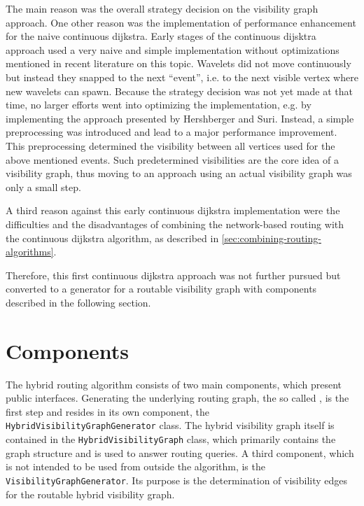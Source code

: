 		The main reason was the overall strategy decision on the visibility graph approach.
		One other reason was the implementation of performance enhancement for the naive continuous dijkstra.
		Early stages of the continuous dijsktra approach used a very naive and simple implementation without optimizations mentioned in recent literature on this topic.
		Wavelets did not move continuously but instead they snapped to the next \enquote{event}, i.e. to the next visible vertex where new wavelets can spawn.
		Because the strategy decision was not yet made at that time, no larger efforts went into optimizing the implementation, e.g. by implementing the approach presented by Hershberger and Suri\cite{hershberger-suri}.
		Instead, a simple preprocessing was introduced and lead to a major performance improvement.
		This preprocessing determined the visibility between all vertices used for the above mentioned events.
		Such predetermined visibilities are the core idea of a visibility graph, thus moving to an approach using an actual visibility graph was only a small step.
		
		A third reason against this early continuous dijkstra implementation were the difficulties and the disadvantages of combining the network-based routing with the continuous dijkstra algorithm, as described in \cref{sec:combining-routing-algorithms}.
		
		Therefore, this first continuous dijkstra approach was not further pursued but converted to a generator for a routable visibility graph with components described in the following section.
	
\section{Components}
\label{sec:components}

	The hybrid routing algorithm consists of two main components, which present public interfaces.
	Generating the underlying routing graph, the so called , is the first step and resides in its own component, the \texttt{HybridVisibilityGraphGenerator} class.
	The hybrid visibility graph itself is contained in the \texttt{HybridVisibilityGraph} class, which primarily contains the graph structure and is used to answer routing queries.
	A third component, which is not intended to be used from outside the algorithm, is the \texttt{VisibilityGraphGenerator}.
	Its purpose is the determination of visibility edges for the routable hybrid visibility graph.
	
